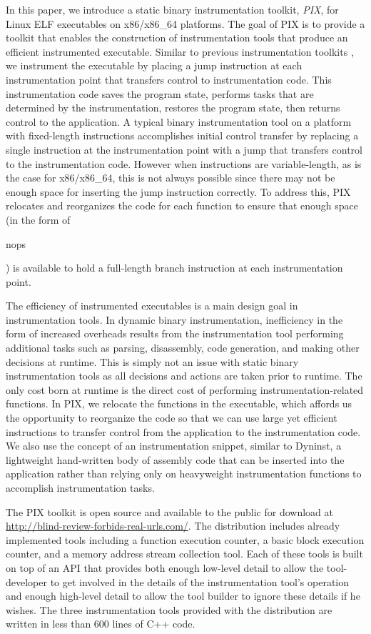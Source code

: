 In this paper, we introduce a static binary instrumentation toolkit, \textit{PIX}, for Linux ELF executables on
x86/x86\_64 platforms. The goal of PIX is to provide a toolkit that enables the construction of
instrumentation tools that produce an efficient instrumented
executable. Similar to previous instrumentation toolkits \cite{buck2000api}, we instrument the executable 
by placing a jump instruction at each instrumentation
point that transfers control to instrumentation code. This instrumentation code saves the
program state, performs tasks that are determined by the instrumentation,
restores the program state, then returns control to the application.
A typical binary instrumentation tool on a platform with fixed-length instructions 
\cite{tikir2006pmac} accomplishes initial control transfer by replacing a
single instruction at the instrumentation point with a jump that transfers
control to the instrumentation code. However when instructions are variable-length, as
is the case for x86/x86\_64, this is not always possible since there may not be enough space for 
inserting the jump instruction correctly. To address this, PIX
relocates and reorganizes the code for each function to ensure that enough
space (in the form of \begin{it}nops\end{it}) is available to hold a full-length branch instruction at each
instrumentation point.

The efficiency of instrumented executables is a main design goal in instrumentation tools. In dynamic binary instrumentation,
inefficiency in the form of increased overheads results from the instrumentation tool performing additional tasks such 
as parsing, disassembly, code generation, and making other decisions at runtime. This
is simply not an issue with static binary instrumentation tools as all
decisions and actions are taken prior to runtime. The only cost born at runtime is the direct
cost of performing instrumentation-related functions. In PIX, we relocate the 
functions in the executable, which affords us the opportunity to reorganize the code so that we
can use large yet efficient instructions to transfer control from the
application to the instrumentation code. We also use the concept of an
instrumentation snippet, similar to Dyninst, a lightweight hand-written body of assembly code that can
be inserted into the application rather than relying only on heavyweight
instrumentation functions to accomplish instrumentation tasks.

The PIX toolkit is open source and available to the public for download 
at \url{http://blind-review-forbids-real-urls.com/}. The distribution includes already implemented tools 
including a function execution counter, a basic block
execution counter, and a memory address stream collection tool. Each of these tools is built on top of
an API that provides both enough low-level detail to allow the tool-developer to get involved in the 
details of the instrumentation tool's operation and enough high-level detail to allow the tool builder
to ignore these details if he wishes. The three instrumentation tools provided with the distribution are written in
less than 600 lines of C++ code.

